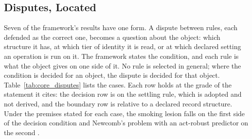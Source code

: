 \documentclass[11pt]{article}
\theoremstyle{definition}
\begin{document}
\subsection{Disputes, Located}\label{sec:core_disputes}

Seven of the framework's results have one form. A dispute between rules, each defended as the correct one, becomes a question about the object: which structure it has, at which tier of identity it is read, or at which declared setting an operation is run on it. The framework states the condition, and each rule is what the object gives on one side of it. No rule is selected in general; where the condition is decided for an object, the dispute is decided for that object. Table~\ref{tab:core_disputes} lists the cases. Each row holds at the grade of the statement it cites: the decision row is on the settling rule, which is adopted and not derived, and the boundary row is relative to a declared record structure. Under the premises stated for each case, the smoking lesion falls on the first side of the decision condition and Newcomb's problem with an act-robust predictor on the second \cite{AethusDecision}.
\end{document}
